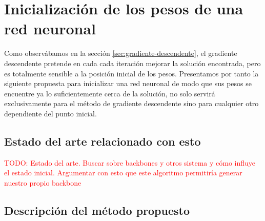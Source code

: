 
\section{ Inicialización de los pesos de una red neuronal}  
\label{section:inicializar_pesos}
Como observábamos en la sección \ref{sec:gradiente-descendente}, el gradiente descendente pretende en cada 
cada iteración mejorar la solución encontrada, pero es 
totalmente sensible a la posición inicial 
de los pesos. 
Presentamos por tanto la siguiente propuesta para inicializar una red neuronal de modo que sus pesos se encuentre ya lo suficientemente cerca de la solución, 
no solo servirá exclusivamente para el método de gradiente descendente 
sino para cualquier otro dependiente del punto inicial. 

\subsection{ Estado del arte relacionado con esto} 

\textcolor{red}{TODO: Estado del arte. Buscar sobre backbones y otros
sistema y cómo influye el estado inicial. Argumentar con esto 
que este algoritmo permitiría generar nuestro propio backbone}

\subsection{Descripción del método propuesto}

